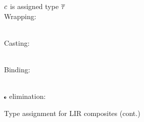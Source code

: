 \documentclass[index.tex]{subfiles}
\begin{document}
\begin{figure} \ContinuedFloat
  \judgbox{\ctxAssignType{\andCtx{\ctx}{\holeCtx}}{\CMV}{\TMV}}
    $\CMV$ is assigned type $\TMV$ \\

  Wrapping:
   \\
  Casting:
   \\
  Binding:
  \begin{mathpar}
  \end{mathpar} \\
  $\KII$ elimination:
  \begin{mathpar}
  \end{mathpar}
  \caption{Type assignment for LIR composites (cont.)}
  \label{fig:lir-ta-comp-cont}
\end{figure}
\end{document}
